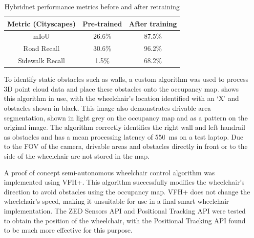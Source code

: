 \documentclass[10pt,twoside]{article}
\begin{document}
\setlength{\textfloatsep}{10pt}
\setlength{\floatsep}{10pt}
\setlength{\intextsep}{10pt}

\setlength{\abovecaptionskip}{10pt}
\setlength{\belowcaptionskip}{0pt}
\begin{table}
    \caption{Hybridnet performance metrics before and after retraining}
    \label{table:retraining}
    \begin{tabular}{c c c}
    \toprule
    Metric (Cityscapes) & Pre-trained & After training \\
    \midrule
    mIoU & 26.6\% & 87.5\% \\
    Road Recall & 30.6\% & 96.2\% \\
    Sidewalk Recall & 1.5\% & 68.2\% \\
    \bottomrule
    \end{tabular}
\end{table}

To identify static obstacles such as walls, a custom algorithm was used to process 3D point cloud data
and place these obstacles onto the occupancy map.
 shows this algorithm in use,
with the wheelchair's location identified with an `X' and obstacles shown in black.
This image also demonstrates drivable area segmentation, shown in light grey on the
occupancy map and as a pattern on the original image.
The algorithm correctly identifies the right wall and left handrail as obstacles
and has a mean processing latency of \SI{550}{\milli\second} on a test laptop.
Due to the FOV of the camera, drivable areas and obstacles directly in front or to the side of
the wheelchair are not stored in the map.

A proof of concept semi-autonomous wheelchair control algorithm was implemented using VFH+.
This algorithm successfully modifies the wheelchair's direction to avoid obstacles using the
occupancy map. VFH+ does not change the wheelchair's speed, making it unsuitable
for use in a final smart wheelchair implementation.
The ZED Sensors API and Positional Tracking API were tested to obtain the position of the wheelchair,
with the Positional Tracking API found to be much more effective for this purpose.
\end{document}
